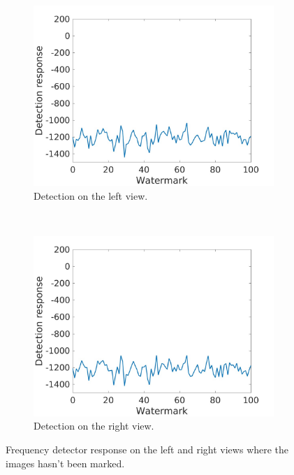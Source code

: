 \begin{figure}[h!]
    \centering
    \begin{subfigure}[t]{0.5\textwidth}
        \centering
\includegraphics[width=1\textwidth]{./img/likelihood/correct_LikelihoodL_NM.jpg}
          \caption{\small{Detection on the left view.}}
\label{fig:Llnm}

    \end{subfigure}%
    ~ 
    \begin{subfigure}[t]{0.5\textwidth}
        \centering
\includegraphics[width=1\textwidth]{./img/likelihood/correct_LikelihoodLr_NM.jpg}
           \caption{\small{Detection on the right view.}}
\label{fig:Lrnm}
    \end{subfigure}
    \caption{Frequency detector response on the left and right views where the images hasn't been marked.}
    \label{fig:Lnm}
\end{figure}

